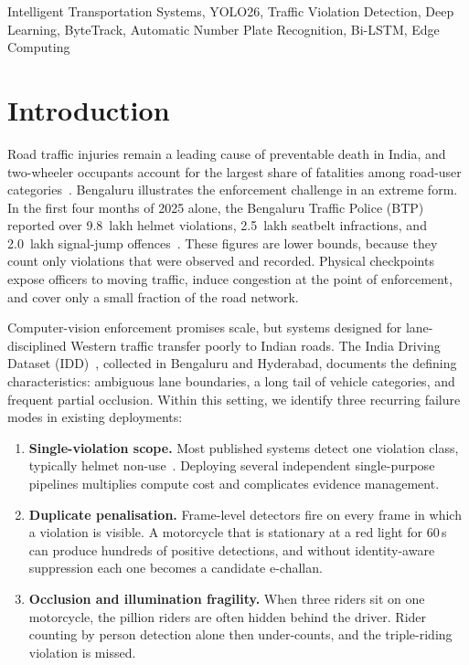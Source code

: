 \documentclass[conference]{IEEEtran}
\begin{document}
\begin{IEEEkeywords}
Intelligent Transportation Systems, YOLO26, Traffic Violation Detection, Deep Learning, ByteTrack, Automatic Number Plate Recognition, Bi-LSTM, Edge Computing
\end{IEEEkeywords}

\section{Introduction}

Road traffic injuries remain a leading cause of preventable death in India, and two-wheeler occupants account for the largest share of fatalities among road-user categories~\cite{morth2022}. Bengaluru illustrates the enforcement challenge in an extreme form. In the first four months of 2025 alone, the Bengaluru Traffic Police (BTP) reported over 9.8~lakh helmet violations, 2.5~lakh seatbelt infractions, and 2.0~lakh signal-jump offences~\cite{btp2025}. These figures are lower bounds, because they count only violations that were observed and recorded. Physical checkpoints expose officers to moving traffic, induce congestion at the point of enforcement, and cover only a small fraction of the road network.

Computer-vision enforcement promises scale, but systems designed for lane-disciplined Western traffic transfer poorly to Indian roads. The India Driving Dataset (IDD)~\cite{varma2019idd}, collected in Bengaluru and Hyderabad, documents the defining characteristics: ambiguous lane boundaries, a long tail of vehicle categories, and frequent partial occlusion. Within this setting, we identify three recurring failure modes in existing deployments:

\begin{enumerate}
\item \textbf{Single-violation scope.} Most published systems detect one violation class, typically helmet non-use~\cite{dahiya2016,siebert2020,soltanikazemi2023}. Deploying several independent single-purpose pipelines multiplies compute cost and complicates evidence management.
\item \textbf{Duplicate penalisation.} Frame-level detectors fire on every frame in which a violation is visible. A motorcycle that is stationary at a red light for 60\,s can produce hundreds of positive detections, and without identity-aware suppression each one becomes a candidate e-challan.
\item \textbf{Occlusion and illumination fragility.} When three riders sit on one motorcycle, the pillion riders are often hidden behind the driver. Rider counting by person detection alone then under-counts, and the triple-riding violation is missed.
\end{enumerate}
\end{document}
